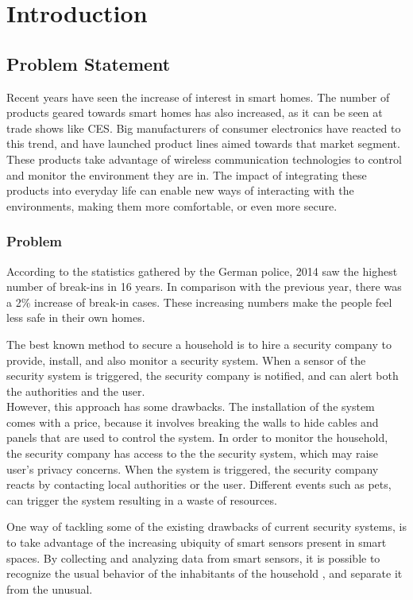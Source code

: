 \chapter{Introduction}
\label{chapter:Introduction}

\section{Problem Statement}

Recent years have seen the increase of interest in smart homes\cite{googletrends}. The number of products geared towards smart homes has also increased, as it can be seen at trade shows like CES\cite{cnet}. Big manufacturers of consumer electronics have reacted to this trend, and have launched product lines aimed towards that market segment. These products take advantage of wireless communication technologies to control and monitor the environment they are in. The impact of integrating these products into everyday life can enable new ways of interacting with the environments, making them more comfortable, or even more secure.

\subsection*{Problem}
According to the statistics gathered by the German police, 2014 saw the highest number of break-ins in 16 years. In comparison with the previous year, there was a 2\% increase of break-in cases\cite{breakins}. These increasing numbers make the people feel less safe in their own homes.

The best known method to secure a household is to hire a security company to provide, install, and also monitor a security system. When a sensor of the security system is triggered, the security company is notified, and can alert both the authorities and the user. \\
However, this approach has some drawbacks. The installation of the system comes with a price, because it involves breaking the walls to hide cables and panels that are used to control the system. In order to monitor the household, the security company has access to the the security system, which may raise user's privacy concerns. When the system is triggered, the security company reacts by contacting local authorities or the user. Different events such as pets, can trigger the system resulting in a waste of resources.

One way of tackling some of the existing drawbacks of current security systems, is to take advantage of the increasing ubiquity of smart sensors present in smart spaces. By collecting and analyzing data from smart sensors, it is possible to recognize the usual behavior of the inhabitants of the household \cite{behavior}, and separate it from the unusual\cite{anomaly}. 


